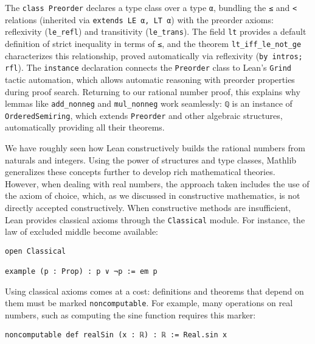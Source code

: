The \lstinline[language=lean]|class Preorder| declares a type class over a type
\lstinline[language=lean]|α|, bundling the \lstinline[language=lean]|≤|
and \lstinline[language=lean]|<| relations
(inherited via \lstinline[language=lean]|extends LE α, LT α|)
with the preorder axioms: reflexivity (\lstinline[language=lean]|le_refl|)
and transitivity (\lstinline[language=lean]|le_trans|).
The field \lstinline[language=lean]|lt| provides a default definition of strict
inequality in terms of \lstinline[language=lean]|≤|,
and the theorem \lstinline[language=lean]|lt_iff_le_not_ge| characterizes this relationship,
proved automatically via reflexivity (\lstinline[language=lean]|by intros; rfl|).
The \lstinline[language=lean]|instance| declaration connects the \lstinline[language=lean]|Preorder|
class to Lean's \lstinline[language=lean]|Grind| tactic automation, which allows automatic
reasoning with preorder properties during proof search.
Returning to our rational number proof, this explains why lemmas
like \lstinline[language=lean]|add_nonneg| and \lstinline[language=lean]|mul_nonneg|
work seamlessly: \lstinline[language=lean]|ℚ| is an instance of
\lstinline[language=lean]|OrderedSemiring|, which extends
\lstinline[language=lean]|Preorder| and other algebraic structures,
automatically providing all their theorems.


We have roughly seen how Lean constructively builds the rational numbers
from naturals and integers. Using the power of structures and type classes,
Mathlib generalizes these concepts further to develop rich mathematical theories.
However, when dealing with real numbers, the approach taken includes
the use of the axiom of choice, which, as we discussed in
constructive mathematics, is not directly accepted constructively.
When constructive methods are insufficient, Lean provides classical
axioms through the \lstinline[language=lean]|Classical| module.
For instance, the law of excluded middle become available:
\begin{lstlisting}[language=lean]
open Classical

example (p : Prop) : p ∨ ¬p := em p 
\end{lstlisting}
Using classical axioms comes at a cost: definitions and theorems that
depend on them must be marked \lstinline[language=lean]|noncomputable|.
For example, many operations on real numbers, such as computing the sine
function requires this marker:
\begin{lstlisting}[language=lean]
noncomputable def realSin (x : ℝ) : ℝ := Real.sin x
\end{lstlisting}

